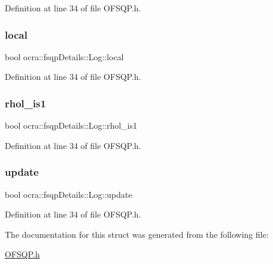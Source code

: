 Definition at line 34 of file O\+F\+S\+Q\+P.\+h.

\hypertarget{structocra_1_1fsqpDetails_1_1Log_a17e784308319e498ceaf11b4b809df52}{}\label{structocra_1_1fsqpDetails_1_1Log_a17e784308319e498ceaf11b4b809df52} 
\subsubsection{\texorpdfstring{local}{local}}
{\footnotesize\ttfamily bool ocra\+::fsqp\+Details\+::\+Log\+::local}



Definition at line 34 of file O\+F\+S\+Q\+P.\+h.

\hypertarget{structocra_1_1fsqpDetails_1_1Log_a9538a5454c767ecb63620f4b36d72676}{}\label{structocra_1_1fsqpDetails_1_1Log_a9538a5454c767ecb63620f4b36d72676} 
\subsubsection{\texorpdfstring{rhol\+\_\+is1}{rhol\_is1}}
{\footnotesize\ttfamily bool ocra\+::fsqp\+Details\+::\+Log\+::rhol\+\_\+is1}



Definition at line 34 of file O\+F\+S\+Q\+P.\+h.

\hypertarget{structocra_1_1fsqpDetails_1_1Log_abb57457b6ee98f85e51eff3b56797668}{}\label{structocra_1_1fsqpDetails_1_1Log_abb57457b6ee98f85e51eff3b56797668} 
\subsubsection{\texorpdfstring{update}{update}}
{\footnotesize\ttfamily bool ocra\+::fsqp\+Details\+::\+Log\+::update}



Definition at line 34 of file O\+F\+S\+Q\+P.\+h.



The documentation for this struct was generated from the following file\+:\begin{DoxyCompactItemize}
\item 
\hyperlink{OFSQP_8h}{O\+F\+S\+Q\+P.\+h}\end{DoxyCompactItemize}
